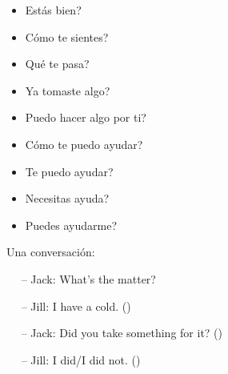 \begin{itemize}
	\item \textquestiondown Est\'as bien? \arr {}
	\item \textquestiondown C\'omo te sientes? \arr {}
	\item \textquestiondown Qu\'e te pasa? \arr {}
	\item \textquestiondown Ya tomaste algo? \arr {}
	\item \textquestiondown Puedo hacer algo por ti? \arr {}
	\item \textquestiondown C\'omo te puedo ayudar? \arr {}
	\item \textquestiondown Te puedo ayudar? \arr {}
	\item \textquestiondown Necesitas ayuda? \arr {}
	\item \textquestiondown Puedes ayudarme? \arr {}
\end{itemize}

Una conversaci\'on:

$\quad$ -- Jack: What's the matter?

$\quad$ -- Jill: I have a cold. ()

$\quad$ -- Jack: Did you take something for it? ()

$\quad$ -- Jill: I did/I did not. ()
